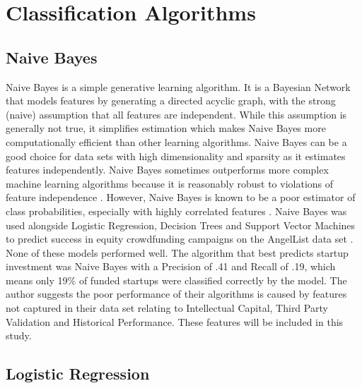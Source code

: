 \chapter{Classification Algorithms}
\label{appendix:classification_algorithms}

\section{Naive Bayes}

Naive Bayes is a simple generative learning algorithm. It is a Bayesian Network that models features by generating a directed acyclic graph, with the strong (naive) assumption that all features are independent. While this assumption is generally not true, it simplifies estimation which makes Naive Bayes more computationally efficient than other learning algorithms. Naive Bayes can be a good choice for data sets with high dimensionality and sparsity as it estimates features independently. Naive Bayes sometimes outperforms more complex machine learning algorithms because it is reasonably robust to violations of feature independence \cite{kotsiantis2007}. However, Naive Bayes is known to be a poor estimator of class probabilities, especially with highly correlated features \cite{niculescu2005}. Naive Bayes was used alongside Logistic Regression, Decision Trees and Support Vector Machines to predict success in equity crowdfunding campaigns on the AngelList data set \cite{beckwith2016}. None of these models performed well. The algorithm that best predicts startup investment was Naive Bayes with a Precision of .41 and Recall of .19, which means only 19\% of funded startups were classified correctly by the model. The author suggests the poor performance of their algorithms is caused by features not captured in their data set relating to Intellectual Capital, Third Party Validation and Historical Performance. These features will be included in this study.

\section{Logistic Regression}

